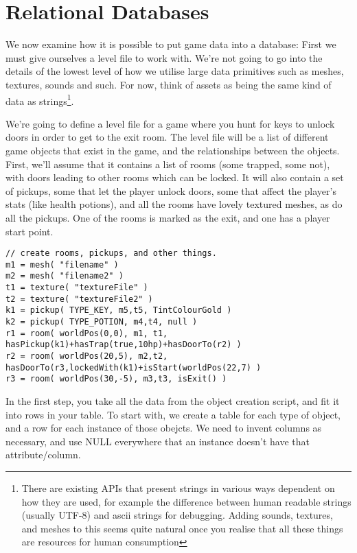\chapter{Relational Databases}

We now examine how it is possible to put game data into a database: First we
must give ourselves a level file to work with. We're not going to go into the
details of the lowest level of how we utilise large data primitives such as
meshes, textures, sounds and such. For now, think of assets as being the same
kind of data as strings\footnote{There are existing APIs that present strings
in various ways dependent on how they are used, for example the difference
between human readable strings (usually UTF-8) and ascii strings for debugging.
Adding sounds, textures, and meshes to this seems quite natural once you
realise that all these things are resources for human consumption}.

We're going to define a level file for a game where you hunt for keys to unlock
doors in order to get to the exit room. The level file will be a list of
different game objects that exist in the game, and the relationships between
the objects.  First, we'll assume that it contains a list of rooms (some
trapped, some not), with doors leading to other rooms which can be locked. It
will also contain a set of pickups, some that let the player unlock doors, some
that affect the player's stats (like health potions), and all the rooms have
lovely textured meshes, as do all the pickups. One of the rooms is marked as
the exit, and one has a player start point.

\begin{lstlisting}[caption=A setup script]
// create rooms, pickups, and other things.
m1 = mesh( "filename" )
m2 = mesh( "filename2" )
t1 = texture( "textureFile" )
t2 = texture( "textureFile2" )
k1 = pickup( TYPE_KEY, m5,t5, TintColourGold )
k2 = pickup( TYPE_POTION, m4,t4, null )
r1 = room( worldPos(0,0), m1, t1, hasPickup(k1)+hasTrap(true,10hp)+hasDoorTo(r2) )
r2 = room( worldPos(20,5), m2,t2, hasDoorTo(r3,lockedWith(k1)+isStart(worldPos(22,7) )
r3 = room( worldPos(30,-5), m3,t3, isExit() )
\end{lstlisting}
\label{src:roomscript}

In the first step, you take all the data from the object creation script, and
fit it into rows in your table. To start with, we create a table for each type
of object, and a row for each instance of those obejcts. We need to invent
columns as necessary, and use NULL everywhere that an instance doesn't have
that attribute/column.

